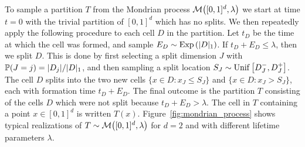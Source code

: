 To sample a partition $T$ from the Mondrian process
$\cM \big( [0,1]^d, \lambda \big)$ we start at time $t=0$ with the trivial
partition of $[0,1]^d$ which has no splits. We then repeatedly apply the
following procedure to each cell $D$ in the partition. Let $t_D$ be the time at
which the cell was formed, and sample $E_D \sim \Exp \left( |D|_1 \right)$. If
$t_D + E_D \leq \lambda$, then we split $D$. This is done by first selecting a
split dimension $J$ with $\P(J=j) = |D_j| / |D|_1$, and then sampling a split
location $S_J \sim \Unif\big[D_J^-, D_J^+\big]$. The cell $D$ splits into the
two new cells $\{x \in D : x_J \leq S_J\}$ and $\{x \in D : x_J > S_J\}$, each
with formation time $t_D + E_D$. The final outcome is the partition $T$
consisting of the cells $D$ which were not split because $t_D + E_D > \lambda$.
The cell in $T$ containing a point $x \in [0,1]^d$ is written $T(x)$.
Figure~\ref{fig:mondrian_process} shows typical realizations of
$T \sim \cM\big( [0,1]^d, \lambda \big)$ for $d=2$ and with different lifetime
parameters $\lambda$.
%
